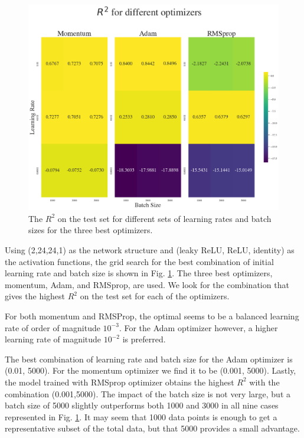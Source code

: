 \begin{figure}[h!]
    \centering
    \includegraphics[width=1.0\linewidth]{project_2/figures/r2_grid_final.png}
    \caption{The $R^2$ on the test set for different sets of learning rates and batch sizes for the three best optimizers.}
    \label{fig:grid_franke}
\end{figure}

Using (2,24,24,1) as the network structure and (leaky ReLU, ReLU, identity) as the activation functions, the grid search for the best combination of initial learning rate and batch size is shown in Fig. \ref{fig:grid_franke}. The three best optimizers, momentum, Adam, and RMSprop, are used. 
We look for the combination that gives the highest $R^2$ on the test set for each of the optimizers. 

For both momentum and RMSProp, the optimal seems to be a balanced learning rate of order of magnitude $10^{-3}$.
For the Adam optimizer however, a higher learning rate of magnitude $10^{-2}$ is preferred.

The best combination of learning rate and batch size for the Adam optimizer is (0.01, 5000). For the momentum optimizer we find it to be (0.001, 5000). Lastly, the model trained with RMSprop optimizer obtains the highest $R^2$ with the combination (0.001,5000). 
The impact of the batch size is not very large, but a batch size of 5000 slightly outperforms both 1000 and 3000 in all nine cases represented in Fig. \ref{fig:grid_franke}. 
It may seem that 1000 data points is enough to get a representative subset of the total data, but that 5000 provides a small advantage. 


